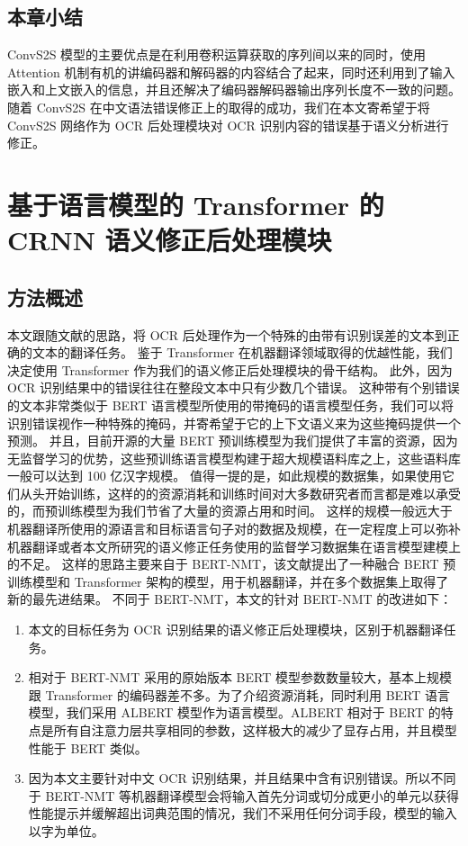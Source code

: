 \section{本章小结}

ConvS2S 模型的主要优点是在利用卷积运算获取的序列间以来的同时，使用 Attention 机制有机的讲编码器和解码器的内容结合了起来，同时还利用到了输入嵌入和上文嵌入的信息，并且还解决了编码器解码器输出序列长度不一致的问题。
随着 ConvS2S 在中文语法错误修正上的取得的成功，我们在本文寄希望于将 ConvS2S 网络作为 OCR 后处理模块对 OCR 识别内容的错误基于语义分析进行修正。

\chapter{基于语言模型的 Transformer 的 CRNN 语义修正后处理模块}
\label{chap:bert_nmt}

\section{方法概述}

本文跟随文献\cite{NLPCC}的思路，将 OCR 后处理作为一个特殊的由带有识别误差的文本到正确的文本的翻译任务。
鉴于 Transformer 在机器翻译领域取得的优越性能，我们决定使用 Transformer 作为我们的语义修正后处理模块的骨干结构。
此外，因为 OCR 识别结果中的错误往往在整段文本中只有少数几个错误。
这种带有个别错误的文本非常类似于 BERT 语言模型所使用的带掩码的语言模型任务，我们可以将识别错误视作一种特殊的掩码，并寄希望于它的上下文语义来为这些掩码提供一个预测。
并且，目前开源的大量 BERT 预训练模型为我们提供了丰富的资源，因为无监督学习的优势，这些预训练语言模型构建于超大规模语料库之上，这些语料库一般可以达到 100 亿汉字规模。
值得一提的是，如此规模的数据集，如果使用它们从头开始训练，这样的的资源消耗和训练时间对大多数研究者而言都是难以承受的，而预训练模型为我们节省了大量的资源占用和时间。
这样的规模一般远大于机器翻译所使用的源语言和目标语言句子对的数据及规模，在一定程度上可以弥补机器翻译或者本文所研究的语义修正任务使用的监督学习数据集在语言模型建模上的不足。
这样的思路主要来自于 BERT-NMT\cite{bert_nmt}，该文献提出了一种融合 BERT 预训练模型和 Transformer 架构的模型，用于机器翻译，并在多个数据集上取得了新的最先进结果。
不同于 BERT-NMT，本文的针对 BERT-NMT 的改进如下：

\begin{enumerate}[(1)]
	\item 本文的目标任务为 OCR 识别结果的语义修正后处理模块，区别于机器翻译任务。
	\item 相对于 BERT-NMT 采用的原始版本 BERT 模型参数数量较大，基本上规模跟 Transformer 的编码器差不多。为了介绍资源消耗，同时利用 BERT 语言模型，我们采用 ALBERT\cite{albert} 模型作为语言模型。ALBERT 相对于 BERT 的特点是所有自注意力层共享相同的参数，这样极大的减少了显存占用，并且模型性能于 BERT 类似。
	\item 因为本文主要针对中文 OCR 识别结果，并且结果中含有识别错误。所以不同于 BERT-NMT 等机器翻译模型会将输入首先分词或切分成更小的单元以获得性能提示并缓解超出词典范围的情况，我们不采用任何分词手段，模型的输入以字为单位。
\end{enumerate}

